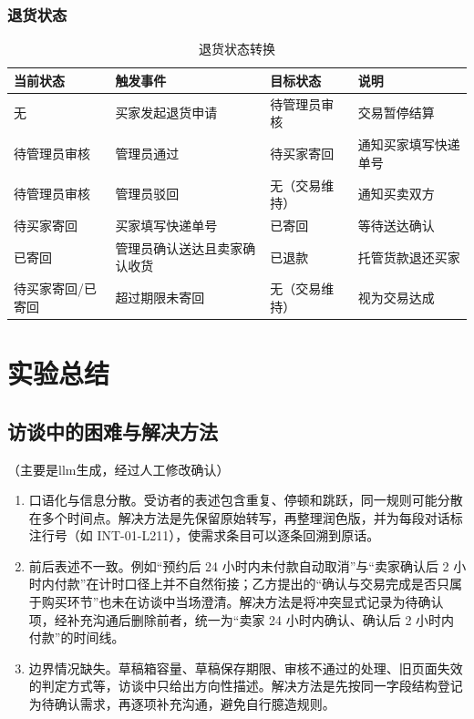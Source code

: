 \documentclass[UTF8,a4paper,zihao=-4]{ctexart}
\begin{document}
\subsubsection{退货状态}

\begin{table}[H]
\centering
\caption{退货状态转换}
\begin{tabular}{p{2.8cm}p{4.4cm}p{3.2cm}p{4.0cm}}
\toprule
当前状态 & 触发事件 & 目标状态 & 说明 \\
\midrule
无 & 买家发起退货申请 & 待管理员审核 & 交易暂停结算 \\
待管理员审核 & 管理员通过 & 待买家寄回 & 通知买家填写快递单号 \\
待管理员审核 & 管理员驳回 & 无（交易维持） & 通知买卖双方 \\
待买家寄回 & 买家填写快递单号 & 已寄回 & 等待送达确认 \\
已寄回 & 管理员确认送达且卖家确认收货 & 已退款 & 托管货款退还买家 \\
待买家寄回/已寄回 & 超过期限未寄回 & 无（交易维持） & 视为交易达成 \\
\bottomrule
\end{tabular}
\end{table}

\section{实验总结}

\subsection{访谈中的困难与解决方法}
（主要是llm生成，经过人工修改确认）
\begin{enumerate}
  \item 口语化与信息分散。受访者的表述包含重复、停顿和跳跃，同一规则可能分散在多个时间点。解决方法是先保留原始转写，再整理润色版，并为每段对话标注行号（如 INT-01-L211），使需求条目可以逐条回溯到原话。
  \item 前后表述不一致。例如“预约后 24 小时内未付款自动取消”与“卖家确认后 2 小时内付款”在计时口径上并不自然衔接；乙方提出的“确认与交易完成是否只属于购买环节”也未在访谈中当场澄清。解决方法是将冲突显式记录为待确认项，经补充沟通后删除前者，统一为“卖家 24 小时内确认、确认后 2 小时内付款”的时间线。
  \item 边界情况缺失。草稿箱容量、草稿保存期限、审核不通过的处理、旧页面失效的判定方式等，访谈中只给出方向性描述。解决方法是先按同一字段结构登记为待确认需求，再逐项补充沟通，避免自行臆造规则。
\end{enumerate}
\end{document}
